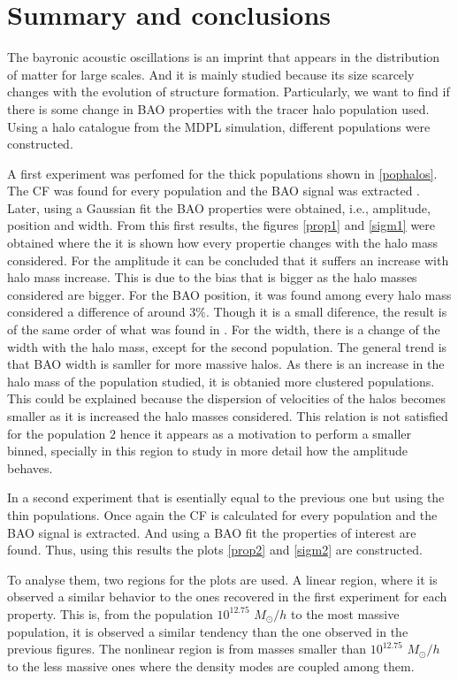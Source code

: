 \chapter{Summary and conclusions}


The bayronic acoustic oscillations is an imprint that appears in the distribution of matter 
for large scales. And it is mainly studied because its size scarcely changes with the evolution of
structure formation. Particularly, we want to find if there is some change in BAO properties with 
the tracer halo population used.
Using a halo catalogue from the MDPL simulation, different populations were 
constructed. 

A first experiment was perfomed for the thick populations shown in \ref{pophalos}.
The CF was found for every population and the BAO signal was extracted . 
Later, using a Gaussian fit the BAO properties were obtained, i.e., amplitude, position 
and width. 
From this first results, the figures \ref{prop1} and \ref{sigm1} were obtained where
the it is shown how every propertie changes with the halo mass considered. 
For the amplitude it can be concluded that it suffers an increase
with halo mass increase. This is due to the bias that is bigger as the halo masses considered
are bigger. 
For the BAO position, it was found among every halo mass considered a difference of around $3\%$.
Though it is a small diference, the result is of the same order of what was found in 
\cite{motion}. 
For the width, there is a change of the width with the halo mass, except for the second 
population. The general trend is that BAO width is samller for more massive halos. As there is an increase in the halo mass of the population studied, it is obtanied
more clustered populations. This could be explained because the dispersion of velocities of
the halos becomes smaller as it is increased the halo masses considered. 
This relation is not satisfied for the population $2$	 hence it appears as a motivation to
perform a smaller binned, specially in this region to study in more detail how the 
amplitude behaves.
	
		
In a second experiment that is esentially equal to the previous one but using the 
thin populations. 
Once again the CF is calculated for every population and the BAO signal is extracted. 
And using a BAO fit the properties of interest are found. Thus, using this results the 
plots \ref{prop2} and \ref{sigm2} are constructed. 

To analyse them, two regions for the plots are used. A linear region, where it is observed
a similar behavior to the ones recovered in the first experiment for each property. This is, 
from the population $10^{12.75}$ $M_{\odot}/h$ to the most massive population, it is observed a similar 
tendency than the one observed in the previous figures. 
The nonlinear region is from masses smaller than $10^{12.75}$ $M_{\odot}/h$ to the less massive ones where
the density modes are coupled among them. 

